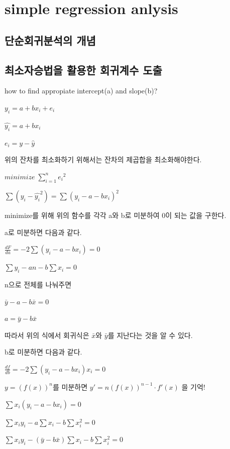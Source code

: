 \documentclass[
]{book}
\begin{document}
\section{simple regression anlysis}\label{simple-regression-anlysis}

\subsection{단순회귀분석의 개념}\label{uxb2e8uxc21cuxd68cuxadc0uxbd84uxc11duxc758-uxac1cuxb150}

\subsection{최소자승법을 활용한 회귀계수 도출}\label{uxcd5cuxc18cuxc790uxc2b9uxbc95uxc744-uxd65cuxc6a9uxd55c-uxd68cuxadc0uxacc4uxc218-uxb3c4uxcd9c}

how to find appropiate intercept(a) and slope(b)?

\(y_{i}=a+bx_{i}+e_{i}\)

\(\hat{y_{i}}=a+bx_{i}\)

\(e_{i}=y-\hat{y}\)

위의 잔차를 최소화하기 위해서는 잔차의 제곱합을 최소화해야한다.

\(minimize\; \sum_{i=1}^{n}{e_{i}}^2\)

\(\sum(y_{i}-\hat{y_{i}}^2)=\sum(y_{i}-a-bx_{i})^2\)

minimize를 위해 위의 함수를 각각 a와 b로 미분하여 0이 되는 값을 구한다.

a로 미분하면 다음과 같다.

\(\frac{dF}{da}=-2\sum(y_{i}-a-bx_{i})=0\)

\(\sum y_{i}-an-b \sum x_{i}=0\)

n으로 전체를 나눠주면

\(\bar{y}-a-b\bar{x}=0\)

\(a=\bar{y}-b\bar{x}\)

따라서 위의 식에서 회귀식은 \(\bar{x}\)와 \(\bar{y}\)를 지난다는 것을 알 수 있다.

b로 미분하면 다음과 같다.

\(\frac{df}{db}=-2\sum (y_{i}-a-bx_{i})x_{i}=0\)

\(y=(f(x))^n\)를 미분하면 \({y}'=n({f(x)})^{n-1}\cdot {f}'(x)\) 을 기억!

\(\sum x_{i}(y_{i}-a-bx_{i})=0\)

\(\sum x_{i}y_{i}-a\sum x_{i} - b\sum x_{i}^2 =0\)

\(\sum x_{i}y_{i}-(\bar{y}-b\bar{x})\sum x_{i} - b\sum x_{i}^2 =0\)
\end{document}
